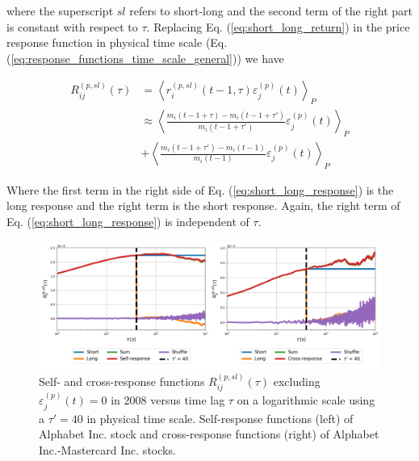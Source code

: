 where the superscript $sl$ refers to short-long and the second term of the
right part is constant with respect to $\tau$. Replacing Eq.
(\ref{eq:short_long_return}) in the price response function in physical time
scale (Eq. (\ref{eq:response_functions_time_scale_general})) we have

\begin{align}\label{eq:short_long_response}
    R^{\left(p, sl\right)}_{ij}\left(\tau\right)&=\left\langle
    r^{\left(p, sl\right)}_{i}\left(t - 1, \tau\right)
    \varepsilon^{\left(p\right)}_{j}\left(t\right)\right\rangle _{P}\nonumber\\
    &\approx\left\langle \frac{m_{i}\left(t - 1 +\tau\right)-m_{i}
    \left(t - 1 +\tau'\right)} {m_{i}\left(t - 1 +\tau'\right)}
    \varepsilon^{\left(p\right)}_{j} \left(t\right)\right\rangle_{P}\nonumber\\
    & +\left\langle \frac{m_{i} \left(t - 1 +\tau'\right)-m_{i}
    \left(t - 1\right)}{m_{i}\left(t - 1\right)}
    \varepsilon^{\left(p\right)}_{j}\left(t\right)\right\rangle _{P}
\end{align}

Where the first term in the right side of Eq. (\ref{eq:short_long_response})
is the long response and the right term is the short response. Again, the right
term of Eq. (\ref{eq:short_long_response}) is independent of $\tau$.

\begin{figure}[htbp]
    \centering
    \includegraphics[width=\textwidth]
    {figures/05_short_long_GOOG_MA.png}
    \caption{Self- and cross-response functions
             $R^{\left(p, sl\right)}_{ij}\left(\tau\right)$ excluding
             $\varepsilon^{\left(p\right)}_{j}\left(t\right) = 0$ in 2008
             versus time lag $\tau$ on a logarithmic scale using a $\tau'=40$
             in physical time scale. Self-response functions (left) of Alphabet
             Inc. stock and cross-response functions (right) of Alphabet
             Inc.-Mastercard Inc. stocks.}
    \label{fig:short_long_responses}
\end{figure}

